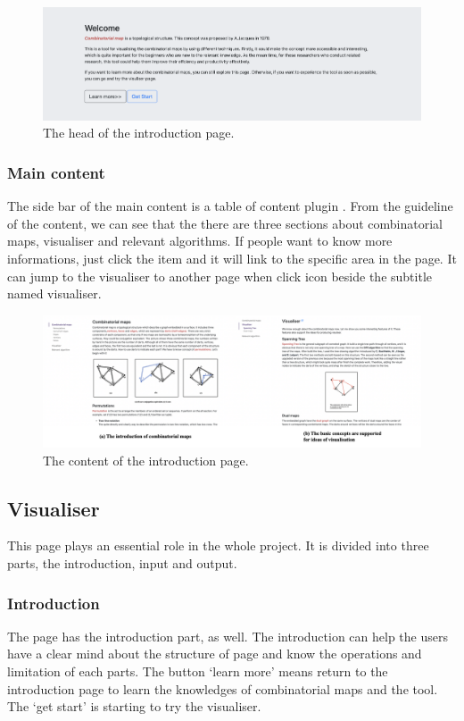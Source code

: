   \begin{figure}[htb]
    \centering
    \includegraphics[width=1\textwidth]{../../image/head.png}
    \caption{The head of the introduction page.}
    \label{fig:figures:head}
  \end{figure}

  \subsubsection{Main content}
  The side bar of the main content is a table of content plugin \cite{tocplugin2019}. From the guideline of the content,  we can see that the there are three sections about combinatorial maps, visualiser and relevant algorithms. If people want to know more informations, just click the item and it will link to the specific area in the page. It can jump to the visualiser to another page when click icon beside the subtitle named visualiser.
  
  \begin{figure}[htb]
    \centering
    \includegraphics[width=1\textwidth]{../../image/content.png}
    \caption{The content of the introduction page.}
    \label{fig:figures:content}
  \end{figure}

  \subsection{Visualiser}
  This page plays an essential role in the whole project. It is divided into three parts, the introduction, input and output. 

  \subsubsection{Introduction}
  The page has the introduction part, as well. The introduction can help the users have a clear mind about the structure of page and know the operations and limitation of each parts. The button `learn more' means return to the introduction page to learn the knowledges of combinatorial maps and the tool. The `get start' is starting to try the visualiser.
  
